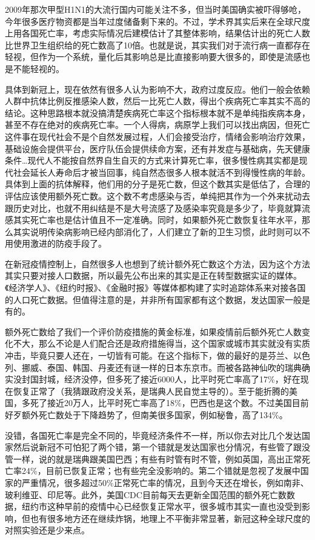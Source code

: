 \documentclass[
]{book}
\begin{document}
2009年那次甲型H1N1的大流行国内可能关注不多，但当时美国确实被吓得够呛，今年很多医疗物资都是当年过度储备剩下来的。不过，学术界其实后来在全球尺度上用各国死亡率，考虑实际情况后建模估计了其整体影响，结果估计出的死亡人数比世界卫生组织给的死亡数高了10倍。也就是说，其实我们对于流行病一直都存在轻视，但作为一个系统，量化后其影响总是比直接影响要大很多的，即使是流感也是不能轻视的。

具体到新冠上，现在依然有很多人认为影响不大，政府过度反应。他们一般会依赖人群中抗体比例反推感染人数，然后一比死亡人数，得出个疾病死亡率其实不高的结论。这种思路根本就没搞清楚疾病死亡率这个指标根本就不是单纯指疾病本身，甚至不存在绝对的疾病死亡率。一个人得病，病原学上我们可以找出病因，但死亡这件事在现代社会不是个自然发展过程，人们会接受治疗，情绪会影响治疗效果，基础设施会提供平台，医疗队伍会提供续命方案，还有并发症与基础病，先天健康条件\ldots 现代人不能按自然界自生自灭的方式来计算死亡率，很多慢性病其实都是现代社会延长人寿命后才被当回事，纯自然态很多人根本就活不到得慢性病的年龄。具体到上面的抗体解释，他们用的分子是死亡数，但这个数其实是低估了，合理的评估应该使用额外死亡数。这个数不考虑感染与否，单纯把其作为一个外来扰动去跟历史对比，也就不用纠结是不是大号流感了及感染率究竟是多少了，毕竟就算流感其实死亡率也是估计值且不一定准确。同时，如果额外死亡数恢复往年水平，那么其实说明传染病影响已经内部消化了，人们建立了新的卫生习惯，此时则可以不用使用激进的防疫手段了。

在新冠疫情控制上，自然很多人也想到了统计额外死亡数这个方法，因为这个方法其实只要对接人口数据，所以最先公布出来的其实是正在转型数据实证的媒体。《经济学人》、《纽约时报》、《金融时报》等媒体都构建了实时追踪体系来对接各国的人口死亡数据。但值得注意的是，并非所有国家都有这个数据，发达国家一般是有的。

额外死亡数给了我们一个评价防疫措施的黄金标准，如果疫情前后额外死亡人数变化不大，那么不论是人们配合还是政府措施得当，这个国家或城市其实就没有实质冲击，毕竟只要人还在，一切皆有可能。在这个指标下，做的最好的是芬兰、以色列、挪威、泰国、韩国、丹麦还有谜一样的日本东京市。而被各路神仙吹的瑞典确实没封国封城，经济没停，但多死了接近6000人，比平时死亡率高了17\%，好在现在恢复正常了（我猜跟政府没关系，是瑞典人民自觉主导的）。至于能折腾的美国，多死了接近20万人，比平时死亡率高了18\%，巴西也是这个数。不过美国目前好歹额外死亡数处于下降趋势了，但南美很多国家，例如秘鲁，高了134\%。

没错，各国死亡率是完全不同的，毕竟经济条件不一样，所以你去对比几个发达国家然后说新冠不可怕犯了两个错，第一个错就是发达国家也分情况，有些管了跟没管一样，说的就是瑞典跟美国巴西；有些有时管有时不管，例如英国，高出正常死亡率24\%，目前已恢复正常；也有些完全没影响的。第二个错就是忽视了发展中国家的严重情况，很多超过50\%正常死亡率的情况，且到今天还在增长，例如南非、玻利维亚、印尼等。此外，美国CDC目前每天去更新全国范围的额外死亡数数据，纽约市这种早前的疫情中心已经恢复正常水平，很多城市其实一直也没受到影响，但也有很多地方还在继续炸锅，地理上不平衡非常显著，新冠这种全球尺度的对照实验还是少来点。
\end{document}
